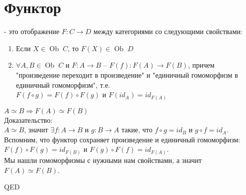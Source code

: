 \documentclass[a4paper]{article}
\theoremstyle{indented}
\theoremstyle{definition}
\theoremstyle{remark}
\DeclareMathOperator{\ra}{\rightarrow}
\DeclareMathOperator{\Ra}{\Rightarrow}
\DeclareMathOperator{\Ob}{Ob}
\begin{document}
\section{Функтор}
 {} - это отображение $F: C \ra D$ между категориями со следующими свойствами:
\begin{enumerate}
    \item Если $X \in\Ob\;C$, то $F(X) \in\Ob\;D$
    \item $\forall A, B \in\Ob\;C$ и $F: A \ra B$ -- $F(f): F(A) \ra F(B)$, причем "произведение переходит в произведение" и "единичный гомоморфизм в единичный гомоморфизм", т.е. \\
    $F(f \circ g) = F(f) \circ F(g)$ и $F(id_A) = id_{F(A)}$
\end{enumerate}
\stat $A \simeq B \Ra F(A) \simeq F(B)$ \\
Доказательство: \\
$A \simeq B$, значит $\exists f: A \ra B$ и $g: B \ra A$ такие, что 
$f \circ g = id_B$ и $g \circ f = id_A$. \\
Вспомним, что функтор сохраняет произведение и единичный гомоморфизм: \\
$F(f) \circ F(g) = id_{F(B)}$ и $F(g) \circ F(f) = id_{F(A)}$. \\
Мы нашли гомоморфизмы с нужными нам свойствами, а значит $F(A) \simeq F(B)$.\\
\begin{flushright}
QED
\end{flushright}
\end{document}

